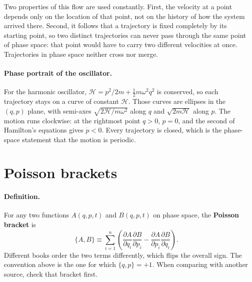 \documentclass[12pt]{article}
\newcommand{\Ham}{\mathcal{H}}
\newcommand{\pb}[2]{\{#1,#2\}}
\begin{document}
Two properties of this flow are used constantly.  First, the velocity
at a point depends only on the location of that point, not on the
history of how the system arrived there.  Second, it follows that a
trajectory is fixed completely by its starting point, so two distinct
trajectories can never pass through the same point of phase space:
that point would have to carry two different velocities at once.
Trajectories in phase space neither cross nor merge.

\paragraph{Phase portrait of the oscillator.}  For the harmonic
oscillator, $\Ham = p^2/2m + \tfrac12 m\omega^2 q^2$ is conserved, so
each trajectory stays on a curve of constant $\Ham$.  Those curves are
ellipses in the $(q,p)$ plane, with semi-axes
$\sqrt{2\Ham/m\omega^2}$ along $q$ and $\sqrt{2m\Ham}$ along $p$.  The
motion runs clockwise: at the rightmost point $q > 0$, $p = 0$, and the
second of Hamilton's equations gives $\dot p < 0$.  Every trajectory is
closed, which is the phase-space statement that the motion is periodic.

\section{Poisson brackets}
\label{sec:poisson}

\paragraph{Definition.}  For any two functions $A(q,p,t)$ and
$B(q,p,t)$ on phase space, the \textbf{Poisson bracket} is
%
\begin{equation}
  \pb{A}{B} \equiv \sum_{i=1}^{n}\left(
     \frac{\partial A}{\partial q_i}\frac{\partial B}{\partial p_i}
   - \frac{\partial A}{\partial p_i}\frac{\partial B}{\partial q_i}
  \right) .
  \label{eq:poisson_def}
\end{equation}
%
Different books order the two terms differently, which flips the
overall sign.  The convention above is the one for which
$\pb{q}{p} = +1$.  When comparing with another source, check that
bracket first.
\end{document}

